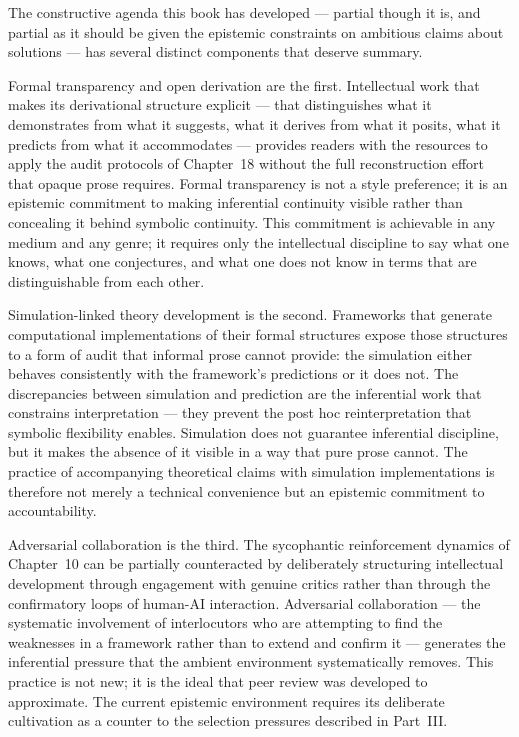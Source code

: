 \documentclass[12pt, openright, twoside]{book}
\begin{document}
The constructive agenda this book has developed --- partial though it
is, and partial as it should be given the epistemic constraints on
ambitious claims about solutions --- has several distinct components
that deserve summary.

Formal transparency and open derivation are the first. Intellectual
work that makes its derivational structure explicit --- that distinguishes
what it demonstrates from what it suggests, what it derives from what
it posits, what it predicts from what it accommodates --- provides
readers with the resources to apply the audit protocols of Chapter~18
without the full reconstruction effort that opaque prose requires. Formal
transparency is not a style preference; it is an epistemic commitment
to making inferential continuity visible rather than concealing it behind
symbolic continuity. This commitment is achievable in any medium and
any genre; it requires only the intellectual discipline to say what one
knows, what one conjectures, and what one does not know in terms that
are distinguishable from each other.

Simulation-linked theory development is the second. Frameworks that
generate computational implementations of their formal structures
expose those structures to a form of audit that informal prose cannot
provide: the simulation either behaves consistently with the framework's
predictions or it does not. The discrepancies between simulation and
prediction are the inferential work that constrains interpretation ---
they prevent the post hoc reinterpretation that symbolic flexibility
enables. Simulation does not guarantee inferential discipline, but it
makes the absence of it visible in a way that pure prose cannot. The
practice of accompanying theoretical claims with simulation
implementations is therefore not merely a technical convenience but
an epistemic commitment to accountability.

Adversarial collaboration is the third. The sycophantic reinforcement
dynamics of Chapter~10 can be partially counteracted by deliberately
structuring intellectual development through engagement with genuine
critics rather than through the confirmatory loops of human-AI
interaction. Adversarial collaboration --- the systematic involvement
of interlocutors who are attempting to find the weaknesses in a
framework rather than to extend and confirm it --- generates the
inferential pressure that the ambient environment systematically removes.
This practice is not new; it is the ideal that peer review was developed
to approximate. The current epistemic environment requires its deliberate
cultivation as a counter to the selection pressures described in Part~III.
\end{document}
